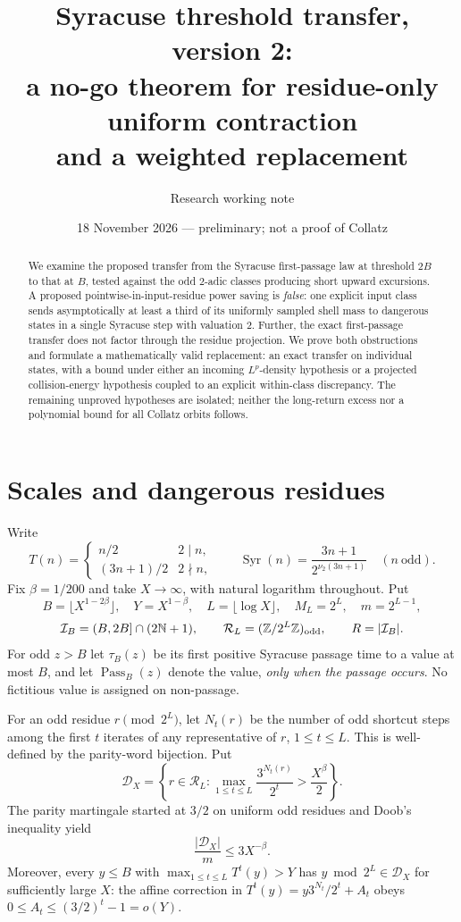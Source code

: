 \documentclass[10pt]{amsart}
\title[Weighted Syracuse threshold transfer]{Syracuse threshold transfer, version 2:\\a no-go theorem for residue-only uniform contraction\\and a weighted replacement}
\author{Research working note}
\date{18 November 2026 --- preliminary; not a proof of Collatz}
\theoremstyle{definition}\newtheorem{definition}{Definition}
\theoremstyle{remark}\newtheorem{remark}{Remark}
\newcommand{\Syr}{\operatorname{Syr}}
\newcommand{\Pass}{\operatorname{Pass}}
\newcommand{\N}{\mathbb N}
\newcommand{\cI}{\mathcal I}
\newcommand{\cR}{\mathcal R}
\newcommand{\cD}{\mathcal D}
\begin{document}
\begin{abstract}
We examine the proposed transfer from the Syracuse first-passage law at threshold $2B$ to that at $B$, tested against the odd $2$-adic classes producing short upward excursions.  A proposed pointwise-in-input-residue power saving is \emph{false}: one explicit input class sends asymptotically at least a third of its uniformly sampled shell mass to dangerous states in a single Syracuse step with valuation $2$.  Further, the exact first-passage transfer does not factor through the residue projection.  We prove both obstructions and formulate a mathematically valid replacement: an exact transfer on individual states, with a bound under either an incoming $L^p$-density hypothesis or a projected collision-energy hypothesis coupled to an explicit within-class discrepancy.  The remaining unproved hypotheses are isolated; neither the long-return excess nor a polynomial bound for all Collatz orbits follows.
\end{abstract}
\maketitle

\section{Scales and dangerous residues}
Write
\[
 T(n)=\begin{cases}n/2&2\mid n,\\(3n+1)/2&2\nmid n,\end{cases}
 \qquad \Syr(n)=\frac{3n+1}{2^{\nu_2(3n+1)}}\quad(n\ \mathrm{odd}).
\]
Fix $\beta=1/200$ and take $X\to\infty$, with natural logarithm throughout. Put
\[
 B=\lfloor X^{1-2\beta}\rfloor,\quad Y=X^{1-\beta},\quad
 L=\lfloor\log X\rfloor,\quad M_L=2^L,\quad m=2^{L-1},
\]
\[\cI_B=(B,2B]\cap (2\N+1),\qquad
\cR_L=(\mathbb Z/2^L\mathbb Z)_{\rm odd},\qquad
 R=|\cI_B|.\]
For odd $z>B$ let $\tau_B(z)$ be its first positive Syracuse passage time to a value at most $B$, and let $\Pass_B(z)$ denote the value, \emph{only when the passage occurs}.  No fictitious value is assigned on non-passage.

For an odd residue $r\pmod{2^L}$, let $N_t(r)$ be the number of odd shortcut steps among the first $t$ iterates of any representative of $r$, $1\le t\le L$. This is well-defined by the parity-word bijection. Put
\begin{equation}\label{eq:D}
 \cD_X=\left\{r\in\cR_L:\max_{1\le t\le L}\frac{3^{N_t(r)}}{2^t}>\frac{X^\beta}{2}\right\}.
\end{equation}
The parity martingale started at $3/2$ on uniform odd residues and Doob's inequality yield
\begin{equation}\label{eq:rare}
 \frac{|\cD_X|}{m}\le 3X^{-\beta}.
\end{equation}
Moreover, every $y\le B$ with $\max_{1\le t\le L}T^t(y)>Y$ has $y\bmod 2^L\in\cD_X$ for sufficiently large $X$: the affine correction in $T^t(y)=y3^{N_t}/2^t+A_t$ obeys $0\le A_t\le(3/2)^t-1=o(Y)$.
\end{document}
